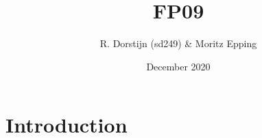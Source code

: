 \documentclass[a4paper]{article}
\title{FP09}
\author{R. Dorstijn (sd249) \& Moritz Epping}
\date{December 2020}
\begin{document}
\maketitle

\section{Introduction}
\end{document}
